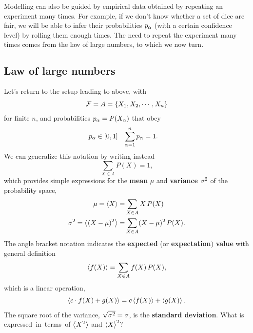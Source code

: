 Modelling can also be guided by empirical data obtained by repeating an experiment many times.
For example, if we don't know whether a set of dice are fair, we will be able to infer their probabilities $p_{\alpha}$ (with a certain confidence level) by rolling them enough times.
The need to repeat the experiment many times comes from the law of large numbers, to which we now turn.



\subsection{\label{sec:LLN}Law of large numbers}
Let's return to the setup leading to  above, with
\begin{equation*}
  \mathcal F = A = \left\{X_1, X_2, \cdots, X_n\right\}
\end{equation*}
for finite $n$, and probabilities $p_{\alpha} = P(X_{\alpha})$ that obey
\begin{align*}
  p_{\alpha} & \in [0, 1] &
  \sum_{\alpha = 1}^n p_{\alpha} & = 1.
\end{align*}
We can generalize this notation by writing instead
\begin{equation*}
  \sum_{X \in A} P(X) = 1,
\end{equation*}
which provides simple expressions for the \textbf{mean} $\mu$ and \textbf{variance} $\sigma^2$ of the probability space,
\begin{align}
              \mu = \left\langle X \right\rangle = & \sum_{X \in A} X \, P(X)            \label{eq:mean} \\
  \sigma^2 = \left\langle (X - \mu)^2 \right\rangle = & \sum_{X \in A} (X - \mu)^2 \, P(X). \label{eq:var}
\end{align}
The angle bracket notation indicates the \textbf{expected} (or \textbf{expectation}) \textbf{value} with general definition
\begin{equation}
  \label{eq:expect_disc}
  \left\langle f(X) \right\rangle = \sum_{X \in A} f(X) \, P(X),
\end{equation}
which is a linear operation,
\begin{equation*}
  \left\langle c\cdot f(X) + g(X) \right\rangle = c\left\langle f(X) \right\rangle + \left\langle g(X) \right\rangle.
\end{equation*}
The square root of the variance, $\sqrt{\sigma^2} = \sigma$, is the \textbf{standard deviation}.
What is \si expressed in terms of $\left\langle X^2 \right\rangle$ and $\left\langle X \right\rangle^2$?
\begin{mdframed}
  \ \\[100 pt]
\end{mdframed}

